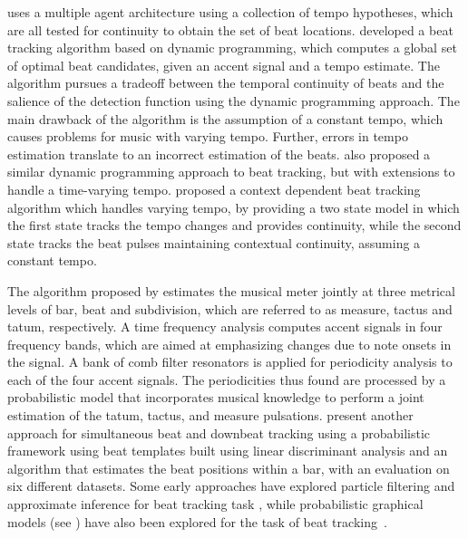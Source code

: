  uses a multiple agent architecture using a collection of tempo hypotheses, which are all tested for continuity to obtain the set of beat locations.  developed a beat tracking algorithm based on dynamic programming, which computes a global set of optimal beat candidates, given an accent signal and a tempo estimate. The algorithm pursues a tradeoff between the temporal continuity of beats and the salience of the detection function using the dynamic programming approach. The main drawback of the algorithm is the assumption of a constant tempo, which causes problems for music with varying tempo. Further, errors in tempo estimation translate to an incorrect estimation of the beats.  also proposed a similar dynamic programming approach to beat tracking, but with extensions to handle a time-varying tempo.  proposed a context dependent beat tracking algorithm which handles varying tempo, by providing a two state model in which the first state tracks the tempo changes and provides continuity, while the second state tracks the beat pulses maintaining contextual continuity, assuming a constant tempo. 

The algorithm proposed by  estimates the musical meter jointly at three metrical levels of bar, beat and subdivision, which are referred to as measure, tactus and tatum, respectively. A time frequency analysis computes accent signals in four frequency bands, which are aimed at emphasizing changes due to note onsets in the signal. A bank of comb filter resonators is applied for periodicity analysis to each of the four accent signals. The periodicities thus found are processed by a probabilistic model that incorporates musical knowledge to perform a joint estimation of the tatum, tactus, and measure pulsations.  present another approach for simultaneous beat and downbeat tracking using a probabilistic framework using beat templates built using linear discriminant analysis and an algorithm that estimates the beat positions within a bar, with an evaluation on six different datasets. Some early approaches have explored particle filtering and approximate inference for beat tracking task \cite{hainsworth:03:pfbeat}, while probabilistic graphical models (see ) have also been explored for the task of beat tracking~\cite{lang:04:thesis,lang:05:beat}. 

